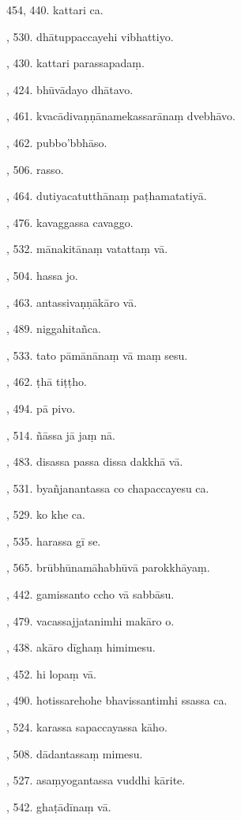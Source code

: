 454, 440. kattari ca.\par {}, 530. dhātuppaccayehi vibhattiyo.\par {}, 430. kattari parassapadaṃ.\par {}, 424. bhūvādayo dhātavo.\par {}, 461. kvacādivaṇṇānamekassarānaṃ dvebhāvo.\par {}, 462. pubbo’bbhāso.\par {}, 506. rasso.\par {}, 464. dutiyacatutthānaṃ paṭhamatatiyā.\par {}, 476. kavaggassa cavaggo.\par {}, 532. mānakitānaṃ vatattaṃ vā.\par {}, 504. hassa jo.\par {}, 463. antassivaṇṇākāro vā.\par {}, 489. niggahitañca.\par {}, 533. tato pāmānānaṃ vā maṃ sesu.\par {}, 462. ṭhā tiṭṭho.\par {}, 494. pā pivo.\par {}, 514. ñāssa jā jaṃ nā.\par {}, 483. disassa passa dissa dakkhā vā.\par {}, 531. byañjanantassa co chapaccayesu ca.\par {}, 529. ko khe ca.\par {}, 535. harassa gī se.\par {}, 565. brūbhūnamāhabhūvā parokkhāyaṃ.\par {}, 442. gamissanto ccho vā sabbāsu.\par {}, 479. vacassajjatanimhi makāro o.\par {}, 438. akāro dīghaṃ himimesu.\par {}, 452. hi lopaṃ vā.\par {}, 490. hotissarehohe bhavissantimhi ssassa ca.\par {}, 524. karassa sapaccayassa kāho.\par {}, 508. dādantassaṃ mimesu.\par {}, 527. asaṃyogantassa vuddhi kārite.\par {}, 542. ghaṭādīnaṃ vā.\par \noindent
